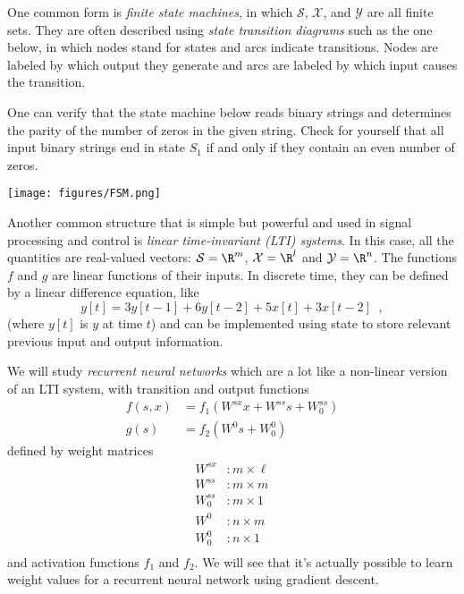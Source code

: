 One common form is {\em  finite state machines},
in which $\mathcal S$, $\mathcal X$, and $\mathcal Y$ are all finite sets.
They are often described using {\em  state transition diagrams} such
as the one below, in which nodes stand for states and arcs indicate
transitions.  Nodes  are  labeled by which output they generate  and
arcs are labeled by which input  causes the  transition.

\begin{examplebox}
One can verify that the state machine below reads binary strings and determines the parity of the number of zeros in the given string.  Check for yourself that all input binary strings end in state $S_1$ if and only if they contain an even number of zeros.
\begin{center}
\texttt{[image: figures/FSM.png]}
\end{center}
\end{examplebox}

Another common structure that is simple but powerful  and  used  in
signal processing and control  is  {\em  linear time-invariant (LTI)
  systems}.  In this case, all the quantities are real-valued vectors: $\mathcal S = \R^m$, $\mathcal X = \R^l$
and $\mathcal Y = \R^n$. The functions $f$ and  $g$ are linear functions  of
their inputs.    In  discrete time, they can  be 
defined by a linear difference equation, like
\begin{equation}
 y[t] = 3y[t - 1] + 6y[t - 2] + 5x[t] + 3x[t - 2] \;\;,
\end{equation}
(where  $y[t]$ is $y$ at time $t$)
and can be implemented using state to store relevant previous
input and output information.

We will study {\it{recurrent neural networks}} which are a lot like a 
non-linear  version of an  LTI system, with transition  and output
functions 
\begin{align}
f(s, x) &  = f_1(W^{sx}x + W^{ss}s + W^{ss}_0) \\
g(s) & = f_2(W^0s + W^0_0) 
\end{align}
defined by weight matrices
\begin{align*}
W^{sx} &:  m \times \ell \\
W^{ss} &: m \times m \\
W^{ss}_0 &: m \times 1 \\
W^{0} &: n \times m \\
W^{0}_0 &: n \times 1 \\
\end{align*}
and activation functions $f_1$ and $f_2$.  We will see that it's
actually possible to learn weight values for a recurrent neural
network using gradient descent.

